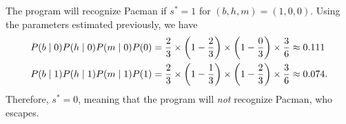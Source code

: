 \documentclass[11pt, a4paper]{exam}
\begin{document}
\begin{exercises}[1, 2][5]
\begin{parts}
    \begin{solution}
        The program will recognize Pacman if $s^* = 1$ for $(b, h, m) = (1, 0, 0)$. Using the parameters estimated previously, we have
        \begin{align*}
            P(b \mid 0) P(h \mid 0) P(m \mid 0) P(0) & = \frac{2}{3} \times \rbk*{1 - \frac{2}{3}} \times \rbk*{1 - \frac{0}{3}} \times \frac{3}{6} \approx \num{0.111} \\
            P(b \mid 1) P(h \mid 1) P(m \mid 1) P(1) & = \frac{2}{3} \times \rbk*{1 - \frac{1}{3}} \times \rbk*{1 - \frac{2}{3}} \times \frac{3}{6} \approx \num{0.074} .
        \end{align*}
        Therefore, $s^* = 0$, meaning that the program will \emph{not} recognize Pacman, who escapes.
    \end{solution}
\end{parts}

\end{exercises}
\end{document}

